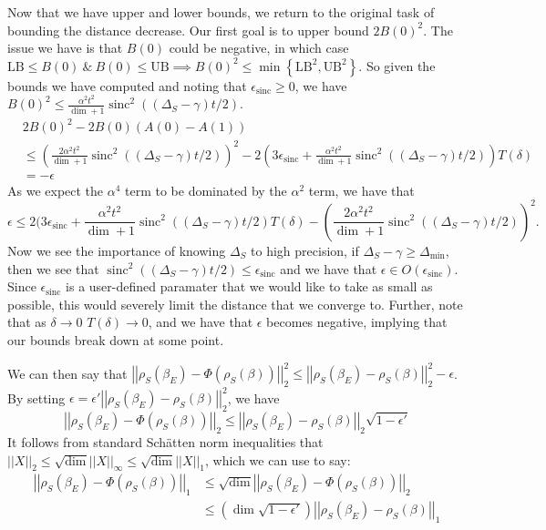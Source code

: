 \documentclass{article}
\newcommand{\parens}[1]{\left( #1 \right)}
\newcommand{\norm}[1]{\left| \left| #1 \right| \right|}
\newcommand{\set}[1]{\left\{ #1 \right\}}
\newcommand{\bigo}[1]{O\left( #1 \right)}
\DeclareMathOperator{\sinc}{sinc}
\begin{document}
Now that we have upper and lower bounds, we return to the original task of bounding the distance decrease. Our first goal is to upper bound $2 B(0)^2$. The issue we have is that $B(0)$ could be negative, in which case $\text{LB} \leq B(0) ~\&~ B(0) \leq \text{UB} \implies B(0)^2 \leq \min \set{\text{LB}^2, \text{UB}^2}$. So given the bounds we have computed and noting that $\epsilon_{\sinc} \geq 0$, we have $B(0)^2 \leq \frac{\alpha^2 t^2}{\dim  + 1} \sinc^2((\Delta_S - \gamma)t/2)$. 
\begin{align}
    &2 B(0)^2 - 2 B(0) (A(0) - A(1)) \\
    &\leq \parens{\frac{2 \alpha^2 t^2}{\dim + 1} \sinc^2 ((\Delta_S -\gamma)t/2)}^2 - 2\parens{3 \epsilon_{\sinc} + \frac{\alpha^2 t^2}{\dim + 1} \sinc^2 ((\Delta_S -\gamma)t/2)} T(\delta) \\
    &= - \epsilon
\end{align}
As we expect the $\alpha^4$ term to be dominated by the $\alpha^2$ term, we have that 
$$\epsilon \leq 2 (3 \epsilon_{\sinc} + \frac{\alpha^2 t^2}{\dim + 1} \sinc^2((\Delta_S - \gamma)t/2) T(\delta) - \parens{\frac{2 \alpha^2 t^2}{\dim + 1} \sinc^2 ((\Delta_S -\gamma)t/2)}^2.$$
Now we see the importance of knowing $\Delta_S$ to high precision, if $\Delta_S - \gamma \geq \Delta_{\min}$, then we see that $\sinc^2((\Delta_S - \gamma)t/2) \leq \epsilon_{\sinc}$ and we have that $\epsilon \in \bigo{\epsilon_{\sinc}}$. Since $\epsilon_{\sinc}$ is a user-defined paramater that we would like to take as small as possible, this would severely limit the distance that we converge to. Further, note that as $\delta \to 0$ $T(\delta) \to 0$, and we have that $\epsilon$ becomes negative, implying that our bounds break down at some point. 

We can then say that $\norm{\rho_S(\beta_E) - \Phi(\rho_S(\beta))}_2^2 \leq \norm{\rho_S(\beta_E) - \rho_S(\beta)}_2^2 - \epsilon$. By setting $\epsilon = \epsilon' \norm{\rho_S(\beta_E) - \rho_S(\beta)}_2^2$, we have
\begin{equation}
    \norm{\rho_S(\beta_E) - \Phi(\rho_S(\beta))}_2 \leq \norm{\rho_S(\beta_E) - \rho_S(\beta)}_2 \sqrt{1 - \epsilon'}
\end{equation}
It follows from standard Sch\"atten norm inequalities that $\norm{X}_2 \leq \sqrt{\dim} \norm{X}_{\infty} \leq \sqrt{\dim} \norm{X}_1$, which we can use to say:
\begin{align}
    \norm{\rho_S(\beta_E) - \Phi(\rho_S(\beta))}_1 &\leq  \sqrt{\dim} \norm{\rho_S(\beta_E) - \Phi(\rho_S(\beta))}_2 \\
    &\leq \parens{\dim \sqrt{1 - \epsilon'}} \norm{\rho_S(\beta_E) - \rho_S(\beta)}_1
\end{align}
\end{document}
